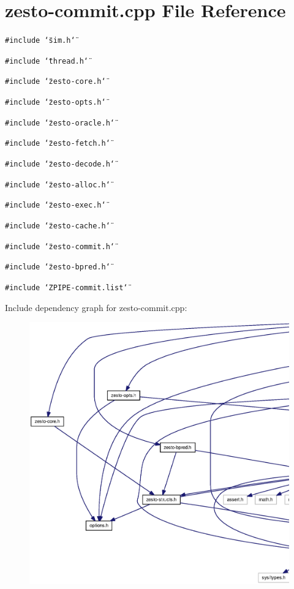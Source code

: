 \section{zesto-commit.cpp File Reference}
\label{zesto-commit_8cpp}
{\tt \#include \char`\"{}sim.h\char`\"{}}\par
{\tt \#include \char`\"{}thread.h\char`\"{}}\par
{\tt \#include \char`\"{}zesto-core.h\char`\"{}}\par
{\tt \#include \char`\"{}zesto-opts.h\char`\"{}}\par
{\tt \#include \char`\"{}zesto-oracle.h\char`\"{}}\par
{\tt \#include \char`\"{}zesto-fetch.h\char`\"{}}\par
{\tt \#include \char`\"{}zesto-decode.h\char`\"{}}\par
{\tt \#include \char`\"{}zesto-alloc.h\char`\"{}}\par
{\tt \#include \char`\"{}zesto-exec.h\char`\"{}}\par
{\tt \#include \char`\"{}zesto-cache.h\char`\"{}}\par
{\tt \#include \char`\"{}zesto-commit.h\char`\"{}}\par
{\tt \#include \char`\"{}zesto-bpred.h\char`\"{}}\par
{\tt \#include \char`\"{}ZPIPE-commit.list\char`\"{}}\par


Include dependency graph for zesto-commit.cpp:\nopagebreak
\begin{figure}[H]
\begin{center}
\leavevmode
\includegraphics[width=420pt]{zesto-commit_8cpp__incl}
\end{center}
\end{figure}
